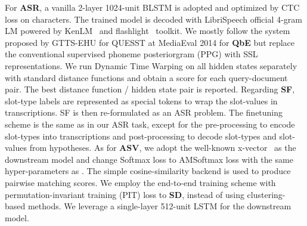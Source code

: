 \documentclass[a4paper]{article}
\begin{document}
For \textbf{ASR}, a vanilla 2-layer 1024-unit BLSTM is adopted and optimized by CTC loss on characters. The trained model is decoded with LibriSpeech official 4-gram LM powered by KenLM~\cite{kenlm} and flashlight~\cite{wav2letter++} toolkit.
We mostly follow the system proposed by GTTS-EHU for QUESST at MediaEval 2014 \cite{gttsehu} for \textbf{QbE} but replace the conventional supervised phoneme posteriorgram (PPG) with SSL representations.
We run Dynamic Time Warping\cite{dtw} on all hidden states separately with standard distance functions and obtain a score for each query-document pair.
The best distance function / hidden state pair is reported.
Regarding \textbf{SF}, slot-type labels are represented as special tokens to wrap the slot-values in transcriptions.
SF is then re-formulated as an ASR problem.
The finetuning scheme is the same as in our ASR task, except for the pre-processing to encode slot-types into transcriptions and post-processing to decode slot-types and slot-values from hypotheses.
As for \textbf{ASV}, we adopt the well-known x-vector~\cite{snyder2018x} as the downstream model and change Softmax loss to AMSoftmax loss with the same hyper-parameters as \cite{voxceleb1}.
The simple cosine-similarity backend is used to produce pairwise matching scores.
We employ the end-to-end training scheme with permutation-invariant training (PIT) loss \cite{fujita2019end} to \textbf{SD}, instead of using clustering-based methods. We leverage a single-layer 512-unit LSTM for the downstream model.

\end{document}
